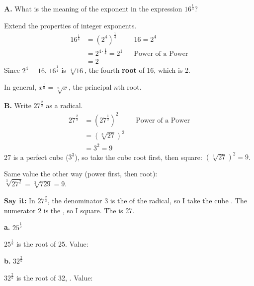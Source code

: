 \begin{minipage}[t]{0.5\textwidth}
\vspace{0pt}\setlength{\abovedisplayskip}{3pt}\setlength{\belowdisplayskip}{3pt}
\textbf{A.} What is the meaning of the exponent in the expression $16^{\frac14}$?

Extend the properties of integer exponents.
\begin{align*}
16^{\frac14}&=\left(2^4\right)^{\frac14} && 16=2^4\\
&=2^{4\cdot\frac14}=2^1 && \text{Power of a Power}\\
&=2
\end{align*}
Since $2^4=16$, $16^{\frac14}$ is $\sqrt[4]{16}$, the fourth \textbf{root} of 16, which is 2.

In general, $x^{\frac1n}=\sqrt[n]{x}$, the principal $n$th root.
\end{minipage}\hfill
\begin{minipage}[t]{0.46\textwidth}
\vspace{0pt}\setlength{\abovedisplayskip}{3pt}\setlength{\belowdisplayskip}{3pt}
\textbf{B.} Write $27^{\frac23}$ as a radical.
\begin{align*}
27^{\frac23}&=\left(27^{\frac13}\right)^2 && \text{Power of a Power}\\
&=\left(\sqrt[3]{27}\right)^2\\
&=3^2=9
\end{align*}
27 is a perfect cube ($3^3$), so take the cube root first, then square: $\left(\sqrt[3]{27}\right)^2=9$.

Same value the other way (power first, then root):\\ $\sqrt[3]{27^2}=\sqrt[3]{729}=9$.
\end{minipage}

\vspace{2pt}

\textbf{Say it:} In $27^{\frac23}$, the denominator 3 is the \blank[2cm] of the radical, so I take the cube \blank[1.6cm]. The numerator 2 is the \blank[1.8cm], so I square. The \blank[2.2cm] is 27.

\begin{minipage}[t]{0.48\textwidth}
\vspace{0pt}
\textbf{a.} $25^{\frac12}$

$25^{\frac12}$ is the \blank[2.4cm] root of 25.
\lines[2]
Value: \blank[2cm]
\end{minipage}\hfill
\begin{minipage}[t]{0.48\textwidth}
\vspace{0pt}
\textbf{b.} $32^{\frac25}$

$32^{\frac25}$ is the \blank[2.4cm] root of 32, \blank[2.2cm].
\lines[2]
Value: \blank[2cm]
\end{minipage}

